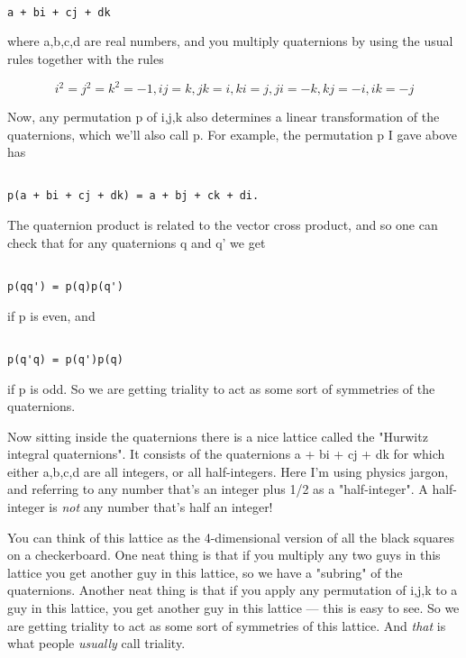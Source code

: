 \begin{verbatim}

a + bi + cj + dk
\end{verbatim}
    
where a,b,c,d are real numbers, and you multiply quaternions
by using the usual rules together with the rules


$$

i^{2} = j^{2} = k^{2} = -1, 
ij =  k, jk =  i, ki =  j,
ji = -k, kj = -i, ik = -j
$$
    
Now, any permutation p of {i,j,k} also determines a linear 
transformation of the quaternions, which we'll also call p.  
For example, the permutation p I gave above has


\begin{verbatim}

p(a + bi + cj + dk) = a + bj + ck + di.
\end{verbatim}
    
The quaternion product is related to the vector cross product,
and so one can check that for any quaternions q and q' we
get 


\begin{verbatim}

p(qq') = p(q)p(q')
\end{verbatim}
    
if p is even, and


\begin{verbatim}

p(q'q) = p(q')p(q)
\end{verbatim}
    
if p is odd.  So we are getting triality to act as some sort
of symmetries of the quaternions.  

Now sitting inside the quaternions there is a nice lattice 
called the "Hurwitz integral quaternions".  It consists of 
the quaternions a + bi + cj + dk for which either a,b,c,d are 
all integers, or all half-integers.  Here I'm using physics jargon, 
and referring to any number that's an integer plus 1/2 as a 
"half-integer".  A half-integer is \emph{not} 
any number that's half 
an integer!   

You can think of this lattice as the 4-dimensional
version of all the black squares on a checkerboard.  
One neat thing is that if you multiply any two guys in
this lattice you get another guy in this lattice, so we
have a "subring" of the quaternions.  Another neat thing is 
that if you apply any permutation of {i,j,k} to a guy in this 
lattice, you get another guy in this lattice --- this is easy
to see.   So we are getting triality to act as some sort
of symmetries of this lattice.  And \emph{that} is what people
\emph{usually} call triality.  

